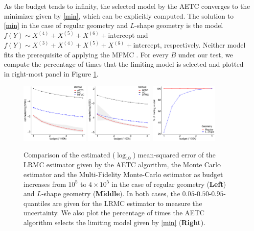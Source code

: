 \documentclass[a4paper,11pt]{article}
\numberwithin{equation}{section}
\theoremstyle{plain}
\theoremstyle{definition}
\begin{document}
As the budget tends to infinity, the selected model by the AETC converges to the minimizer given by \eqref{min}, which can be explicitly computed. 
The solution to \eqref{min} in the case of regular geometry and $L$-shape geometry is the model $f(Y)\sim X^{(4)}+X^{(5)}+X^{(6)}+\text{intercept}$ and $f(Y)\sim X^{(3)}+X^{(4)}+X^{(5)}+X^{(6)}+\text{intercept}$, respectively. Neither model fits the prerequisite of applying the MFMC \cite[condition (20)]{Peherstorfer_2016}. For every $B$ under our test, we compute the percentage of times that the limiting model is selected and plotted in right-most panel in Figure \ref{fig:1}. 
\begin{figure}[h!]
\begin{center}
\includegraphics[width=0.30\textwidth]{s-r.pdf}
\includegraphics[width=0.30\textwidth]{s-r_new.pdf}
\includegraphics[width=0.30\textwidth]{model_s.pdf}
\caption{\small Comparison of the estimated ($\log_{10}$) mean-squared error of the LRMC estimator given by the AETC algorithm, the Monte Carlo estimator and the Multi-Fidelity Monte-Carlo estimator as budget increases from $10^5$ to $4\times 10^5$ in the case of regular geometry (\textbf{Left}) and $L$-shape geometry (\textbf{Middle}).  In both cases, the $0.05$-$0.50$-$0.95$-quantiles are given for the LRMC estimator to measure the uncertainty. We also plot the percentage of times the AETC algorithm selects the limiting model given by \eqref{min} (\textbf{Right}).}
  \label{fig:1}
  \end{center}
\end{figure}
\end{document}
